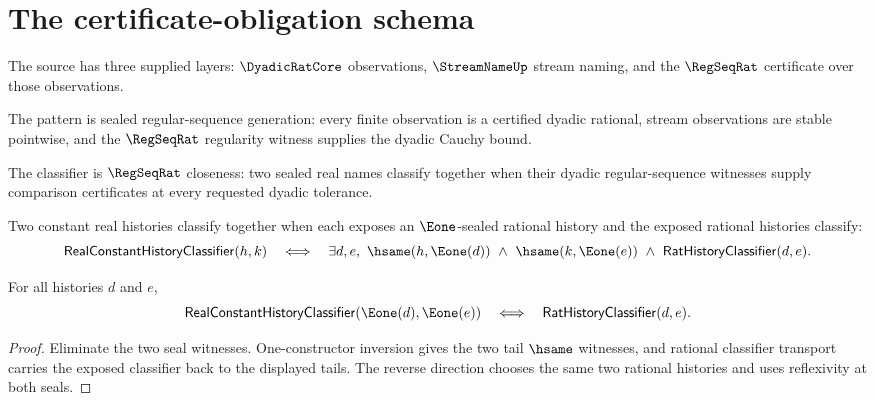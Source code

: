 \section{The certificate-obligation schema}

\begin{definition}
\label{def:real-source-specification}
The source has three supplied layers: $\DyadicRatCore$ observations, $\StreamNameUp$ stream naming, and the $\RegSeqRat$ certificate over those observations.
\end{definition}

\begin{definition}
\label{def:real-pattern-specification}
The pattern is sealed regular-sequence generation: every finite observation is a certified dyadic rational, stream observations are stable pointwise, and the $\RegSeqRat$ regularity witness supplies the dyadic Cauchy bound.
\end{definition}

\begin{definition}
\label{def:real-classifier-specification}
The classifier is $\RegSeqRat$ closeness: two sealed real names classify together when their dyadic regular-sequence witnesses supply comparison certificates at every requested dyadic tolerance.
\end{definition}

\begin{definition}
\label{def:real-constant-history-classifier}
Two constant real histories classify together when each exposes an $\Eone$-sealed rational history and the exposed rational histories classify:
$$
\mathsf{RealConstantHistoryClassifier}(h,k)
\quad\Longleftrightarrow\quad
\exists d,e,\ \hsame(h,\Eone(d))\ \wedge\ \hsame(k,\Eone(e))
\ \wedge\ \mathsf{RatHistoryClassifier}(d,e).
$$
\end{definition}

\begin{theorem}
\label{thm:real-constant-history-classifier-e1-iff-rat}
For all histories $d$ and $e$,
$$
\mathsf{RealConstantHistoryClassifier}(\Eone(d),\Eone(e))
\quad\Longleftrightarrow\quad
\mathsf{RatHistoryClassifier}(d,e).
$$
\end{theorem}
\begin{proof}
Eliminate the two seal witnesses. One-constructor inversion gives the two tail
$\hsame$ witnesses, and rational classifier transport carries the exposed
classifier back to the displayed tails. The reverse direction chooses the same
two rational histories and uses reflexivity at both seals.
\end{proof}

